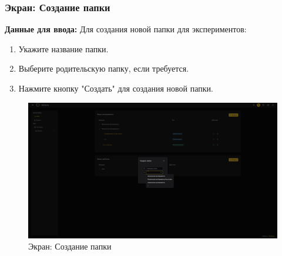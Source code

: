 \documentclass[a4paper,12pt,reqno]{article}
\begin{document}
\subsubsection{Экран: Создание папки}
\textbf{Данные для ввода:}  
Для создания новой папки для экспериментов:
\begin{enumerate}
    \item Укажите название папки.
    \item Выберите родительскую папку, если требуется.
    \item Нажмите кнопку "Создать" для создания новой папки.
\end{enumerate}
\begin{figure}[H]
    \centering
    \includegraphics[width=\textwidth]{RO/img/create_folder.png} %
    \caption{Экран: Создание папки}
    \label{fig:create_folder}
\end{figure}
\end{document}
